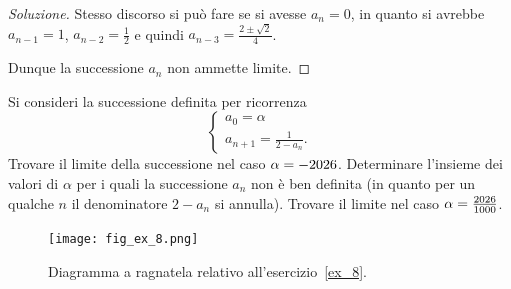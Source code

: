 \begin{proof}[Soluzione]
  Stesso discorso si può fare se si avesse $a_n=0$, in quanto si
  avrebbe $a_{n-1} = 1$, $a_{n-2} = \frac 1 2$ e quindi $a_{n-3}=\frac{2 \pm \sqrt 2}{4}$.

  Dunque la successione $a_n$ non ammette limite.
\end{proof}

\begin{exercise}\label{ex_8}
  Si consideri la successione definita per ricorrenza
  \[
  \begin{cases}
    a_0 = \alpha\\
    a_{n+1} = \frac{1}{2-a_n}.
  \end{cases}
  \]
  Trovare il limite della successione nel caso $\alpha =
  -\the\year$. Determinare l'insieme dei valori di $\alpha$ per i quali la
  successione $a_n$ non è ben definita (in quanto per un qualche $n$ il
  denominatore $2-a_n$ si annulla).
  Trovare il limite nel caso $\alpha=\frac{\the\year}{1000}$.
\end{exercise}

\newsavebox{\qrexotto}
\begin{figure}
 \begin{center}
    \texttt{[image: fig\_ex\_8.png]}
  \end{center}
  \caption{Diagramma a ragnatela relativo
    all'esercizio~\ref{ex_8}.
    \ifwidemargin\\\\\fi%
    \usebox{\qrexotto}}
  \label{fig_ex_8}
\end{figure}

